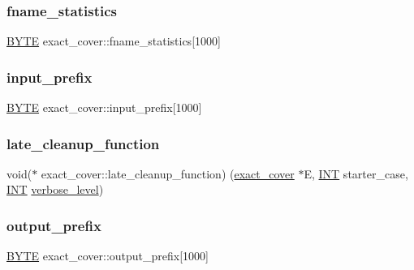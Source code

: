 \subsubsection{\texorpdfstring{fname\+\_\+statistics}{fname\_statistics}}
{\footnotesize\ttfamily \mbox{\hyperlink{galois_8h_ab6cc7b4aeb6ea31aba2b3fbfc83ff5e6}{B\+Y\+TE}} exact\+\_\+cover\+::fname\+\_\+statistics\mbox{[}1000\mbox{]}}

\mbox{\label{classexact__cover_a6b8795af812c7d8a13567dd533e7692e}} 
\subsubsection{\texorpdfstring{input\+\_\+prefix}{input\_prefix}}
{\footnotesize\ttfamily \mbox{\hyperlink{galois_8h_ab6cc7b4aeb6ea31aba2b3fbfc83ff5e6}{B\+Y\+TE}} exact\+\_\+cover\+::input\+\_\+prefix\mbox{[}1000\mbox{]}}

\mbox{\label{classexact__cover_a2de0d7595958b0daae7cee54d3ae1904}} 
\subsubsection{\texorpdfstring{late\+\_\+cleanup\+\_\+function}{late\_cleanup\_function}}
{\footnotesize\ttfamily void($\ast$ exact\+\_\+cover\+::late\+\_\+cleanup\+\_\+function) (\mbox{\hyperlink{classexact__cover}{exact\+\_\+cover}} $\ast$E, \mbox{\hyperlink{galois_8h_a09fddde158a3a20bd2dcadb609de11dc}{I\+NT}} starter\+\_\+case, \mbox{\hyperlink{galois_8h_a09fddde158a3a20bd2dcadb609de11dc}{I\+NT}} \mbox{\hyperlink{simeon_8_c_a818073fbcc2f439e7c56952f67386122}{verbose\+\_\+level}})}

\mbox{\label{classexact__cover_a798cf43561b3cfb9502a0be28f45b084}} 
\subsubsection{\texorpdfstring{output\+\_\+prefix}{output\_prefix}}
{\footnotesize\ttfamily \mbox{\hyperlink{galois_8h_ab6cc7b4aeb6ea31aba2b3fbfc83ff5e6}{B\+Y\+TE}} exact\+\_\+cover\+::output\+\_\+prefix\mbox{[}1000\mbox{]}}

